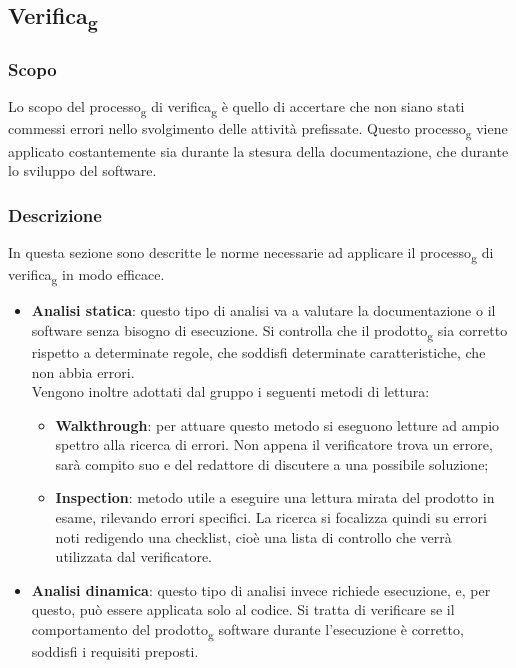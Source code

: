 \subsection{Verifica\textsubscript{g}}
\subsubsection{Scopo}
Lo scopo del processo\textsubscript{g} di verifica\textsubscript{g} è quello di accertare che non siano stati commessi 
errori nello svolgimento delle attività prefissate. Questo processo\textsubscript{g} viene applicato 
costantemente sia durante la stesura della documentazione, che durante lo sviluppo 
del software. 

\subsubsection{Descrizione}
In questa sezione sono descritte le norme necessarie ad applicare il processo\textsubscript{g} di 
verifica\textsubscript{g} in modo efficace.
\begin{itemize}
    \item \textbf{Analisi statica}: questo tipo di analisi va a valutare la 
    documentazione o il software senza bisogno di esecuzione. Si controlla che il 
    prodotto\textsubscript{g} sia corretto rispetto a determinate regole, che soddisfi determinate 
    caratteristiche, che non abbia errori.\\ Vengono inoltre adottati dal gruppo i seguenti metodi di lettura:
    \begin{itemize}
    \item \textbf{Walkthrough}: per attuare questo metodo si eseguono letture ad ampio spettro alla ricerca di errori. Non appena il verificatore trova un errore, sarà compito suo e del redattore di discutere a una possibile soluzione;
    \item \textbf{Inspection}: metodo utile a eseguire una lettura mirata del prodotto in esame, rilevando errori specifici. La ricerca si focalizza quindi su errori noti redigendo una checklist, cioè una lista di controllo che verrà utilizzata dal verificatore.
    \end{itemize} 
    \item \textbf{Analisi dinamica}: questo tipo di analisi invece richiede esecuzione, e, per 
    questo, può essere applicata solo al codice. Si tratta di verificare se il comportamento del 
    prodotto\textsubscript{g} software durante l’esecuzione è corretto, soddisfi i requisiti preposti.
\end{itemize} 


